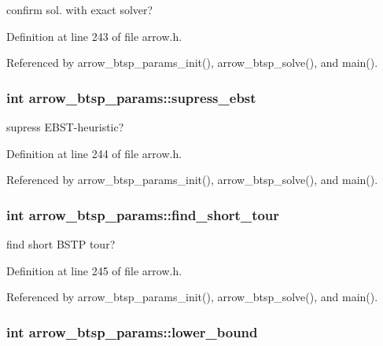 confirm sol. with exact solver? 

Definition at line 243 of file arrow.h.

Referenced by arrow\_\-btsp\_\-params\_\-init(), arrow\_\-btsp\_\-solve(), and main().\hypertarget{structarrow__btsp__params_cd85b850ac7c8495a4689100e8c3182c}{
\subsubsection{\setlength{\rightskip}{0pt plus 5cm}int {\bf arrow\_\-btsp\_\-params::supress\_\-ebst}}}
\label{structarrow__btsp__params_cd85b850ac7c8495a4689100e8c3182c}


supress EBST-heuristic? 

Definition at line 244 of file arrow.h.

Referenced by arrow\_\-btsp\_\-params\_\-init(), arrow\_\-btsp\_\-solve(), and main().\hypertarget{structarrow__btsp__params_f5fd677200b64930838c6905cbada990}{
\subsubsection{\setlength{\rightskip}{0pt plus 5cm}int {\bf arrow\_\-btsp\_\-params::find\_\-short\_\-tour}}}
\label{structarrow__btsp__params_f5fd677200b64930838c6905cbada990}


find short BSTP tour? 

Definition at line 245 of file arrow.h.

Referenced by arrow\_\-btsp\_\-params\_\-init(), arrow\_\-btsp\_\-solve(), and main().\hypertarget{structarrow__btsp__params_da747e3797f9327834e4dbb1459d2786}{
\subsubsection{\setlength{\rightskip}{0pt plus 5cm}int {\bf arrow\_\-btsp\_\-params::lower\_\-bound}}}
\label{structarrow__btsp__params_da747e3797f9327834e4dbb1459d2786}


